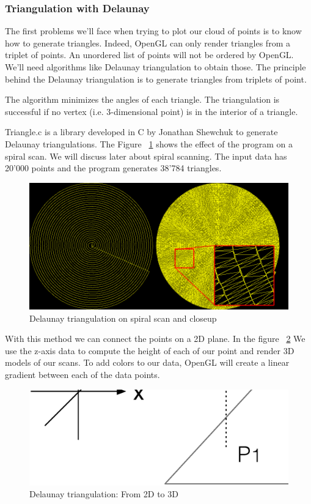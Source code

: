 \subsubsection{Triangulation with Delaunay}

The first problems we'll face when trying to plot our cloud of points is to know how to generate triangles. Indeed, OpenGL can only render triangles from a triplet of points. An unordered list of points will not be ordered by OpenGL. We'll need  algorithms like Delaunay triangulation to obtain those.
The principle behind the Delaunay triangulation is to generate triangles from triplets of point. 

The algorithm minimizes the angles of each triangle. The triangulation is successful if no vertex (i.e. 3-dimensional point) is in the interior of a triangle.

Triangle.c is a library developed in C by Jonathan Shewchuk \cite{shewchuk96b} to generate Delaunay triangulations. The Figure ~\ref{triangulation2d} shows the effect of the program on a spiral scan.  We will discuss later about spiral scanning. The input data has 20'000 points and the program generates 38'784 triangles. 

\begin{figure}[H]
  \centering
  \includegraphics[scale=0.5]{images/triangulation.png}
    \caption{Delaunay triangulation on spiral scan and closeup}
  \label{triangulation2d}
\end{figure}


With this method we can connect the points on a 2D plane. In the figure  ~\ref{triangulation3d}  We use the z-axis data to compute the height of each of our point and render 3D models of our scans. To add colors to our data, OpenGL will create a linear gradient between each of the data points.
\begin{figure}[H]
  \centering
  \includegraphics[scale=0.3]{images/delaunay.eps}
    \caption{Delaunay triangulation: From 2D to 3D}
  \label{triangulation3d}
\end{figure}

